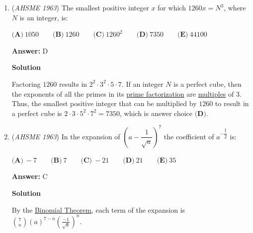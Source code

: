 \begin{enumerate}
Write each equation in slope-intercept from since the slopes are easier to compare.

 Equation $(1)$ in slope-intercept form is $y = \frac{2}{3}x+4$.

 Equation $(2)$ in slope-intercept form is $y = -\frac{2}{3}x - \frac{10}{3}$.

 Equation $(3)$ in slope-intercept form is $y = -\frac{2}{3}x + 4$.

 Equation $(4)$ in slope-intercept form is $y = -\frac{3}{2}x + 5$.

 Remember that if the two lines are perpendicular, then the product of two slopes equals $-1$.  Equations $(1)$ and $(4)$ satisfy the condition, so the answer is $\boxed{\textbf{(A)}}$.

 


	\item (\textit{AHSME 1963}) The smallest positive integer $x$ for which $1260x=N^3$, where $N$ is an integer, is:


 

$\textbf{(A)}\ 1050 \qquad \textbf{(B)}\ 1260 \qquad \textbf{(C)}\ 1260^2 \qquad \textbf{(D)}\ 7350 \qquad \textbf{(E)}\ 44100$

 \textbf{Answer: }D



\textbf{Solution}

Factoring $1260$ results in $2^2 \cdot 3^2 \cdot 5 \cdot 7$.  If an integer $N$ is a perfect cube, then the exponents of all the primes in its \href{https://artofproblemsolving.com/wiki/index.php?title=Prime\_factorization}{prime factorization} are \href{https://artofproblemsolving.com/wiki/index.php?title=Multiples}{multiples} of 3.  Thus, the smallest positive integer that can be multiplied by $1260$ to result in a perfect cube is $2 \cdot 3 \cdot 5^2 \cdot 7^2 = 7350$, which is answer choice $\boxed{\textbf{(D)}}$.

 


	\item (\textit{AHSME 1963}) In the expansion of $\left(a-\dfrac{1}{\sqrt{a}}\right)^7$ the coefficient of $a^{-\dfrac{1}{2}}$ is:


 $\textbf{(A)}\ -7 \qquad \textbf{(B)}\ 7 \qquad \textbf{(C)}\ -21 \qquad \textbf{(D)}\ 21 \qquad \textbf{(E)}\ 35$

 \textbf{Answer: }C



\textbf{Solution}

By the \href{https://artofproblemsolving.com/wiki/index.php?title=Binomial\_Theorem}{Binomial Theorem}, each term of the expansion is $\binom{7}{n}(a)^{7-n}(\frac{-1}{\sqrt{a}})^n$.


\end{enumerate}
